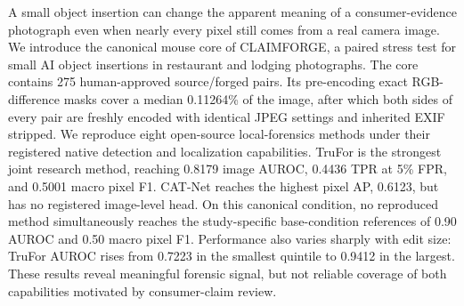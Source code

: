 A small object insertion can change the apparent meaning of a consumer-evidence photograph even when nearly every pixel still comes from a real camera image. We introduce the canonical mouse core of CLAIMFORGE, a paired stress test for small AI object insertions in restaurant and lodging photographs. The core contains 275 human-approved source/forged pairs. Its pre-encoding exact RGB-difference masks cover a median 0.11264\% of the image, after which both sides of every pair are freshly encoded with identical JPEG settings and inherited EXIF stripped. We reproduce eight open-source local-forensics methods under their registered native detection and localization capabilities. TruFor is the strongest joint research method, reaching 0.8179 image AUROC, 0.4436 TPR at 5\% FPR, and 0.5001 macro pixel F1. CAT-Net reaches the highest pixel AP, 0.6123, but has no registered image-level head. On this canonical condition, no reproduced method simultaneously reaches the study-specific base-condition references of 0.90 AUROC and 0.50 macro pixel F1. Performance also varies sharply with edit size: TruFor AUROC rises from 0.7223 in the smallest quintile to 0.9412 in the largest. These results reveal meaningful forensic signal, but not reliable coverage of both capabilities motivated by consumer-claim review.
